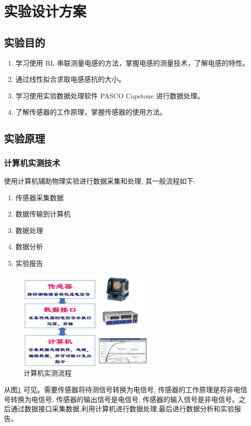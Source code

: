 \documentclass[a4paper]{../phyreport}
\begin{document}
\phyExpCover

\section{实验设计方案}
\subsection{实验目的}
\begin{enumerate}
  \item 学习使用 RL 串联测量电感的方法，掌握电感的测量技术，了解电感的特性。
  \item 通过线性拟合求取电感感抗的大小。
  \item 学习使用实验数据处理软件 PASCO Capstone 进行数据处理。
  \item 了解传感器的工作原理，掌握传感器的使用方法。
\end{enumerate}
\subsection{实验原理}
\subsubsection{计算机实测技术}
使用计算机辅助物理实验进行数据采集和处理, 其一般流程如下:
\begin{enumerate}
  \item 传感器采集数据
  \item 数据传输到计算机
  \item 数据处理
  \item 数据分析
  \item 实验报告
\end{enumerate}
\begin{figure}[htbp]
  \centering
  \includegraphics[width=0.6\textwidth]{./fig/计算机实测流程图.png}
  \caption{计算机实测流程}
  \label{fig:计算机实测流程}
\end{figure}
从图\ref{fig:计算机实测流程}
可见。需要传感器将待测信号转换为电信号, 传感器的工作原理是将非电信号转换为电信号, 传感器的输出信号是电信号, 传感器的输入信号是非电信号。之后通过数据接口采集数据,利用计算机进行数据处理,最后进行数据分析和实验报告。
\end{document}
